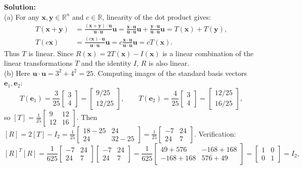 \documentclass[11pt, letterpaper]{article}
\theoremstyle{definition}
\theoremstyle{remark}
\begin{document}
\textbf{Solution:} \\
(a) For any $\mathbf{x}, \mathbf{y} \in \mathbb{R}^n$ and $c \in \mathbb{R}$, linearity of the dot product gives:
\begin{align*}
T(\mathbf{x} + \mathbf{y}) &= \frac{(\mathbf{x} + \mathbf{y}) \cdot \mathbf{u}}{\mathbf{u} \cdot \mathbf{u}}\mathbf{u} = \frac{\mathbf{x} \cdot \mathbf{u}}{\mathbf{u} \cdot \mathbf{u}}\mathbf{u} + \frac{\mathbf{y} \cdot \mathbf{u}}{\mathbf{u} \cdot \mathbf{u}}\mathbf{u} = T(\mathbf{x}) + T(\mathbf{y}), \\
T(c\mathbf{x}) &= \frac{(c\mathbf{x}) \cdot \mathbf{u}}{\mathbf{u} \cdot \mathbf{u}}\mathbf{u} = c\frac{\mathbf{x} \cdot \mathbf{u}}{\mathbf{u} \cdot \mathbf{u}}\mathbf{u} = cT(\mathbf{x}).
\end{align*}
Thus $T$ is linear. Since $R(\mathbf{x}) = 2T(\mathbf{x}) - I(\mathbf{x})$ is a linear combination of the linear transformations $T$ and the identity $I$, $R$ is also linear. \\
(b) Here $\mathbf{u} \cdot \mathbf{u} = 3^2 + 4^2 = 25$. Computing images of the standard basis vectors $\mathbf{e}_1, \mathbf{e}_2$:
\[
T(\mathbf{e}_1) = \frac{3}{25}\begin{bmatrix} 3 \\ 4 \end{bmatrix} = \begin{bmatrix} 9/25 \\ 12/25 \end{bmatrix}, \qquad
T(\mathbf{e}_2) = \frac{4}{25}\begin{bmatrix} 3 \\ 4 \end{bmatrix} = \begin{bmatrix} 12/25 \\ 16/25 \end{bmatrix},
\]
so $[T] = \frac{1}{25}\begin{bmatrix} 9 & 12 \\ 12 & 16 \end{bmatrix}$. Then $[R] = 2[T] - I_2 = \frac{1}{25}\begin{bmatrix} 18 - 25 & 24 \\ 24 & 32 - 25 \end{bmatrix} = \frac{1}{25}\begin{bmatrix} -7 & 24 \\ 24 & 7 \end{bmatrix}$. Verification:
\[
[R]^T [R] = \frac{1}{625}\begin{bmatrix} -7 & 24 \\ 24 & 7 \end{bmatrix}\begin{bmatrix} -7 & 24 \\ 24 & 7 \end{bmatrix} = \frac{1}{625}\begin{bmatrix} 49 + 576 & -168 + 168 \\ -168 + 168 & 576 + 49 \end{bmatrix} = \begin{bmatrix} 1 & 0 \\ 0 & 1 \end{bmatrix} = I_2,
\]
\end{document}
